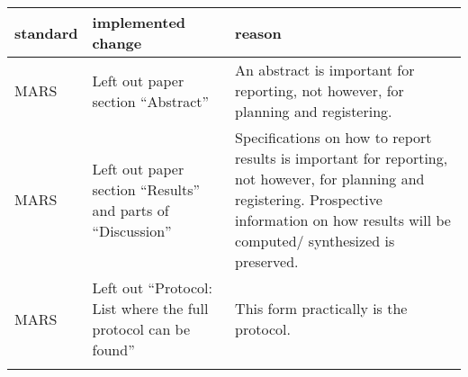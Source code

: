 \documentclass[]{article}
\begin{document}
\hypertarget{changes}{}
\begin{longtable}[]{@{}lll@{}}
\toprule
\begin{minipage}[b]{0.15\columnwidth}\raggedright
standard\strut
\end{minipage} & \begin{minipage}[b]{0.33\columnwidth}\raggedright
implemented change\strut
\end{minipage} & \begin{minipage}[b]{0.43\columnwidth}\raggedright
reason\strut
\end{minipage}\tabularnewline
\midrule
\endhead
\begin{minipage}[t]{0.15\columnwidth}\raggedright
MARS\strut
\end{minipage} & \begin{minipage}[t]{0.33\columnwidth}\raggedright
Left out paper section ``Abstract''\strut
\end{minipage} & \begin{minipage}[t]{0.43\columnwidth}\raggedright
An abstract is important for reporting, not however, for planning and
registering.\strut
\end{minipage}\tabularnewline
\begin{minipage}[t]{0.15\columnwidth}\raggedright
MARS\strut
\end{minipage} & \begin{minipage}[t]{0.33\columnwidth}\raggedright
Left out paper section ``Results'' and parts of ``Discussion''\strut
\end{minipage} & \begin{minipage}[t]{0.43\columnwidth}\raggedright
Specifications on how to report results is important for reporting, not
however, for planning and registering. Prospective information on how
results will be computed/ synthesized is preserved.\strut
\end{minipage}\tabularnewline
\begin{minipage}[t]{0.15\columnwidth}\raggedright
MARS\strut
\end{minipage} & \begin{minipage}[t]{0.33\columnwidth}\raggedright
Left out ``Protocol: List where the full protocol can be found''\strut
\end{minipage} & \begin{minipage}[t]{0.43\columnwidth}\raggedright
This form practically is the protocol.\strut
\end{minipage}\tabularnewline
\begin{minipage}[t]{0.15\columnwidth}\raggedright

\end{minipage}
\end{longtable}
\end{document}
